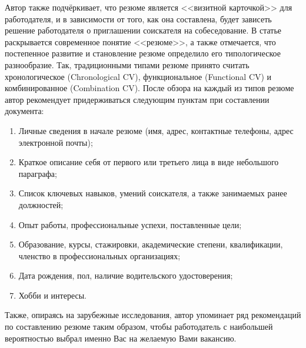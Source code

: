 \documentclass[master, och, pract]{SCWorks}
\begin{document}
Автор также подчёркивает, что резюме является <<визитной карточкой>> для работодателя, 
и в зависимости от того, как она составлена, будет зависеть решение работодателя 
о приглашении соискателя на собеседование. В статье раскрывается современное 
понятие <<резюме>>, а также отмечается, что постепенное развитие и становление 
резюме определило его типологическое разнообразие. Так, традиционными типами 
резюме принято считать хронологическое (Chronological CV), функциональное 
(Functional CV) и комбинированное (Combination CV). После обзора 
на каждый из типов резюме автор рекомендует придерживаться следующим пунктам при 
составлении документа:
\begin{enumerate}
    \item Личные сведения в начале резюме (имя, адрес, контактные телефоны, 
    адрес электронной почты); 
    \item Краткое описание себя от первого или третьего лица в виде небольшого параграфа;
    \item Список ключевых навыков, умений соискателя, а также занимаемых ранее должностей;
    \item Опыт работы, профессиональные успехи, поставленные цели;
    \item Образование, курсы, стажировки, академические степени, 
    квалификации, членство в профессиональных организациях; 
    \item Дата рождения, пол, наличие водительского удостоверения; 
    \item Хобби и интересы.
\end{enumerate}

Также, опираясь на зарубежные исследования, автор упоминает ряд рекомендаций по 
составлению резюме таким образом, чтобы работодатель с наибольшей вероятностью 
выбрал именно Вас на желаемую Вами вакансию\cite{Kosolapova_2020}.
\end{document}

